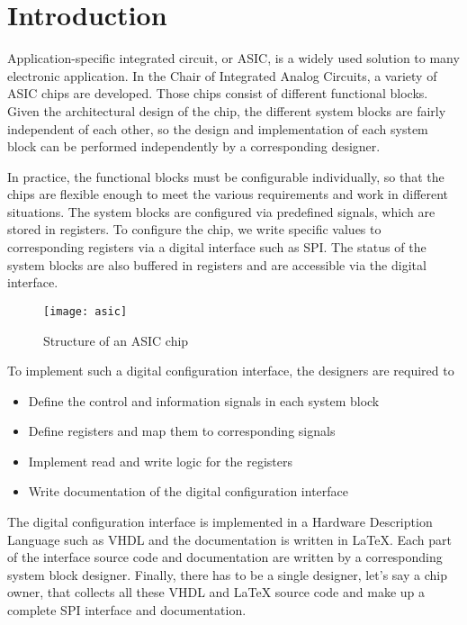 \chapter{Introduction}
Application-specific \cite{latexcompanion}  integrated circuit, or ASIC, is a widely used solution to many electronic application. In the Chair of Integrated Analog Circuits, a variety of ASIC chips are developed. Those chips consist of different functional blocks. Given the architectural design of the chip, the different system blocks are fairly independent of each other, so the design and implementation of each system block can be performed independently by a corresponding designer.

In practice, the functional blocks must be configurable individually, so that the chips are flexible enough to meet the various requirements and work in different situations. The system blocks are configured via predefined signals, which are stored in registers. To configure the chip, we write specific values to corresponding registers via a digital interface such as SPI. The status of the system blocks are also buffered in registers and are accessible via the digital interface.

\begin{figure}[htbp]
\centering
\texttt{[image: asic]}
\caption{Structure of an ASIC chip\label{fig:Structure of an ASIC Chip}}
\end{figure}

To implement such a digital configuration interface, the designers are required to
\begin{itemize}
\item Define the control and information signals in each system block
\item Define registers and map them to corresponding signals
\item Implement read and write logic for the registers
\item Write documentation of the digital configuration interface
\end{itemize}

The digital configuration interface is implemented in a Hardware Description Language such as VHDL and the documentation is written in LaTeX. Each part of the interface source code and documentation are written by a corresponding system block designer. Finally, there has to be a single designer, let’s say a chip owner, that collects all these VHDL and LaTeX source code and make up a complete SPI interface and documentation.


